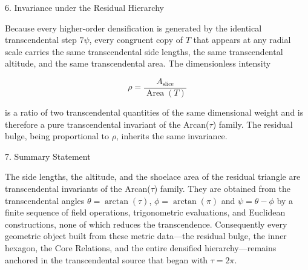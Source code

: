 6. Invariance under the Residual Hierarchy

Because every higher-order densification is generated by the identical transcendental step \(7\psi\), every congruent copy of \(T\) that appears at any radial scale carries the same transcendental side lengths, the same transcendental altitude, and the same transcendental area. The dimensionless intensity

\[
\rho=\frac{A_{\mathrm{slice}}}{\operatorname{Area}(T)}
\]

is a ratio of two transcendental quantities of the same dimensional weight and is therefore a pure transcendental invariant of the Arcan(\(\tau\)) family. The residual bulge, being proportional to \(\rho\), inherits the same invariance.

7. Summary Statement

The side lengths, the altitude, and the shoelace area of the residual triangle are transcendental invariants of the Arcan(\(\tau\)) family. They are obtained from the transcendental angles \(\theta=\arctan(\tau)\), \(\phi=\arctan(\pi)\) and \(\psi=\theta-\phi\) by a finite sequence of field operations, trigonometric evaluations, and Euclidean constructions, none of which reduces the transcendence. Consequently every geometric object built from these metric data—the residual bulge, the inner hexagon, the Core Relations, and the entire densified hierarchy—remains anchored in the transcendental source that began with \(\tau=2\pi\).
